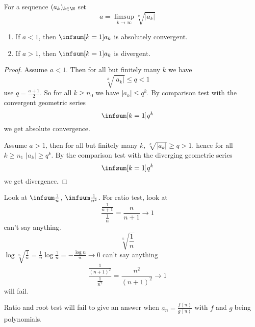 \documentclass[10pt, a4paper]{article}
\newcommand{\dseq}[2][n]{(#2_#1)_{#1 \in \N}}
\begin{document}
\begin{theorem}
    For a sequence $\dseq[k]{a}$ set
    \[
    a = \limsup_{k \to \infty}\sqrt[k]{|a_k|}
    \]
    \begin{enumerate}[label = (\alph*)]
        \item If $a < 1$,
        then $\displaystyle\infsum[k = 1]a_k$ is absolutely convergent.
        \item If $a > 1$,
        then $\displaystyle\infsum[k = 1]a_k$ is divergent.
    \end{enumerate}
    \begin{proof}
        Assume $a < 1$.
        Then for all but finitely many $k$ we have
        \[
        \sqrt[k]{|a_k|} \leq q < 1
        \]
        use $q = \frac{a + 1}{2}$.
        So for all $k \geq n_0$ we have $|a_k| \leq q ^ k$.
        By comparison test with the convergent geometric series
        \[
        \infsum[k = 1]q ^ k
        \]
        we get absolute convergence.

        Assume $a > 1$,
        then for all but finitely many $k$,
        $\sqrt[k]{|a_k|} \geq q > 1$.
        hence for all $k \geq n_1$ $|a_k| \geq q ^ k$.
        By the comparison test with the diverging geometric series
        \[
        \infsum[k = 1]q ^ k
        \]
        we get divergence.
    \end{proof}
\end{theorem}

\begin{example}
    Look at $\infsum\frac{1}{n}$,
    $\infsum\frac{1}{n ^ 2}$.
    For ratio test,
    look at
    \[
    \frac{\frac{1}{n + 1}}{\frac{1}{n}} = \frac{n}{n + 1} \to 1
    \]
    can't say anything.
    \[
    \sqrt[n]{\frac{1}{n}}
    \]
    $\log\sqrt[n]{\frac{1}{n}} = \frac{1}{n}\log\frac{1}{n} = -\frac{\log n}{n} \to 0$
    can't say anything
    \[
    \frac{\frac{1}{(n + 1) ^ 2}}{\frac{1}{n ^ 2}} = \frac{n ^ 2}{(n + 1) ^ 2} \to 1
    \]
    will fail.
\end{example}

Ratio and root test will fail to give an answer when $a_n = \frac{f(n)}{g(n)}$ with $f$ and $g$ being polynomials.
\end{document}

